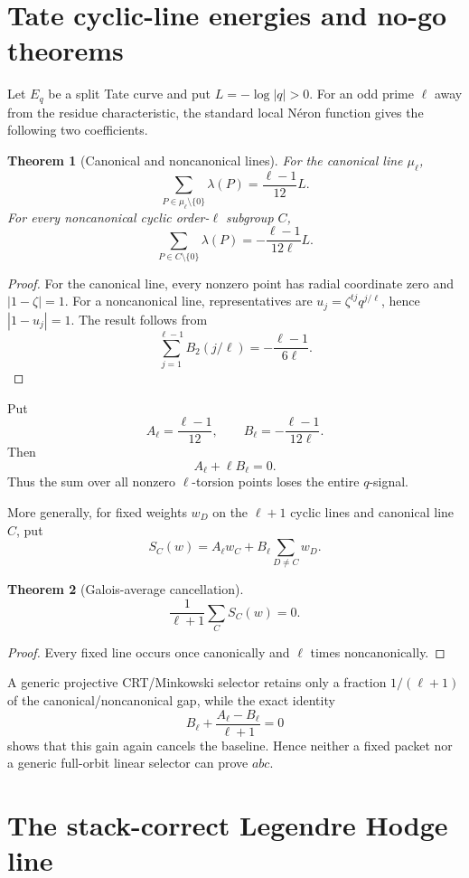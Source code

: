 \documentclass[11pt]{amsart}
\newtheorem{theorem}{Theorem}[section]
\theoremstyle{definition}
\theoremstyle{remark}
\begin{document}
\section{Tate cyclic-line energies and no-go theorems}

Let $E_q$ be a split Tate curve and put $L=-\log|q|>0$.  For an odd prime $\ell$ away from the residue characteristic, the standard local N\'eron function gives the following two coefficients.

\begin{theorem}[Canonical and noncanonical lines]
For the canonical line $\mu_\ell$,
\[
 \sum_{P\in\mu_\ell\setminus\{0\}}\lambda(P)
 =\frac{\ell-1}{12}L.
\]
For every noncanonical cyclic order-$\ell$ subgroup $C$,
\[
 \sum_{P\in C\setminus\{0\}}\lambda(P)
 =-\frac{\ell-1}{12\ell}L.
\]
\end{theorem}

\begin{proof}
For the canonical line, every nonzero point has radial coordinate zero and $|1-\zeta|=1$.  For a noncanonical line, representatives are
$u_j=\zeta^{tj}q^{j/\ell}$, hence $|1-u_j|=1$.  The result follows from
\[
 \sum_{j=1}^{\ell-1}B_2(j/\ell)
 =-\frac{\ell-1}{6\ell}.
\]
\end{proof}

Put
\[
 A_\ell=\frac{\ell-1}{12},\qquad
 B_\ell=-\frac{\ell-1}{12\ell}.
\]
Then
\[
 A_\ell+\ell B_\ell=0.
\]
Thus the sum over all nonzero $\ell$-torsion points loses the entire $q$-signal.

More generally, for fixed weights $w_D$ on the $\ell+1$ cyclic lines and canonical line $C$, put
\[
 S_C(w)=A_\ell w_C+B_\ell\sum_{D\ne C}w_D.
\]

\begin{theorem}[Galois-average cancellation]
\[
 \frac1{\ell+1}\sum_CS_C(w)=0.
\]
\end{theorem}

\begin{proof}
Every fixed line occurs once canonically and $\ell$ times noncanonically.
\end{proof}

A generic projective CRT/Minkowski selector retains only a fraction
$1/(\ell+1)$ of the canonical/noncanonical gap, while the exact identity
\[
 B_\ell+\frac{A_\ell-B_\ell}{\ell+1}=0
\]
shows that this gain again cancels the baseline.  Hence neither a fixed packet nor a generic full-orbit linear selector can prove $abc$.

\section{The stack-correct Legendre Hodge line}
\end{document}
